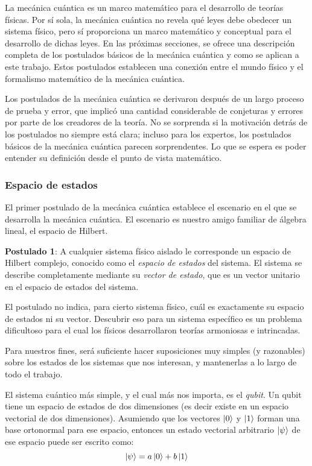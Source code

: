 La mecánica cuántica es un marco matemático para el desarrollo de teorías físicas. Por sí sola, la mecánica cuántica no revela qué leyes debe obedecer un sistema físico, pero sí proporciona un marco matemático y conceptual para el desarrollo de dichas leyes. En las próximas secciones, se ofrece una descripción completa de los postulados básicos de la mecánica cuántica y como se aplican a este trabajo. Estos postulados establecen una conexión entre el mundo físico y el formalismo matemático de la mecánica cuántica.

Los postulados de la mecánica cuántica se derivaron después de un largo proceso de prueba y error, que implicó una cantidad considerable de conjeturas y errores por parte de los creadores de la teoría. No se sorprenda si la motivación detrás de los postulados no siempre está clara; incluso para los expertos, los postulados básicos de la mecánica cuántica parecen sorprendentes. Lo que se espera es poder entender su definición desde el punto de vista matemático.

\subsubsection{Espacio de estados}
El primer postulado de la mecánica cuántica establece el escenario en el que se desarrolla la mecánica cuántica. El escenario es nuestro amigo familiar de álgebra lineal, el espacio de Hilbert.

\begin{displayquote}
\textbf{Postulado 1}: A cualquier sistema físico aislado le corresponde un espacio de Hilbert complejo, conocido como el \emph{espacio de estados} del sistema. El sistema se describe completamente mediante su \emph{vector de estado}, que es un vector unitario en el espacio de estados del sistema.
\end{displayquote}

El postulado no indica, para cierto sistema físico, cuál es exactamente su espacio de estados ni su vector. Descubrir eso para un sistema específico es un problema dificultoso para el cual los físicos desarrollaron teorías armoniosas e intrincadas.

Para nuestros fines, será suficiente hacer suposiciones muy simples (y razonables) sobre los estados de los sistemas que nos interesan, y mantenerlas a lo largo de todo el trabajo.

El sistema cuántico más simple, y el cual más nos importa, es el \emph{qubit}. Un qubit tiene un espacio de estados de dos dimensiones (es decir existe en un espacio vectorial de dos dimensiones). Asumiendo que los vectores $\ket{0}$ y $\ket{1}$ forman una base ortonormal para ese espacio, entonces un estado vectorial arbitrario $\ket{\psi}$ de ese espacio puede ser escrito como:
\begin{equation}\label{eq:qubit}
    \ket{\psi} = a\ket{0} + b\ket{1}
\end{equation}

